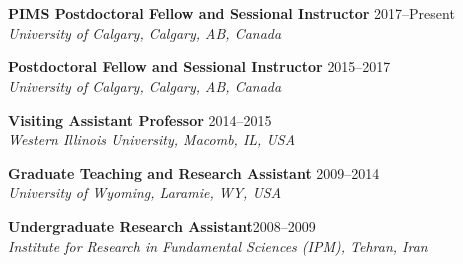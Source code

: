 \documentclass[margin,line,pifont,palatino,courier]{res}
\begin{document}
\begin{resume}
\section{} 

\Fields{\Degree\Major\Date\School\Address\Advisor\Thesis\Link}


\section{} 
\begin{description}
	\item \textbf{PIMS Postdoctoral Fellow and Sessional Instructor}  \hfill {2017--Present} \\
		{\sl University of Calgary, Calgary, AB, Canada}
	
	\item \textbf{Postdoctoral Fellow and Sessional Instructor}   \hfill {2015--2017} \\
		{\sl University of Calgary, Calgary, AB, Canada}

	\item \textbf{Visiting Assistant Professor} \hfill {2014--2015}\\
		{\sl Western Illinois University, Macomb, IL, USA}
		
	\item \textbf{Graduate Teaching and Research Assistant} \hfill {2009--2014} \\
		\phantom{--} {\sl University of Wyoming, Laramie, WY, USA}
		
	\item \textbf{Undergraduate Research Assistant}\hfill {2008--2009} \\
		{\sl Institute for Research in Fundamental Sciences (IPM), Tehran, Iran} 
\end{description}
 

\end{resume}
\end{document}
